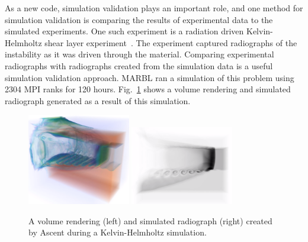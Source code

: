 As a new code, simulation validation plays an important role, and one method
for simulation validation is comparing the results of experimental data to the
simulated experiments.
%
One such experiment is a radiation driven Kelvin-Helmholtz shear
layer experiment~\cite{hurricane2009high}.
%
The experiment captured radiographs of the instability as it was driven through
the material. Comparing experimental radiographs with radiographs created from
the simulation data is a useful simulation validation approach.
%
MARBL ran a simulation of this problem using 2304 MPI ranks for 120 hours.
%
Fig.~\ref{img:radkh} shows a volume rendering and simulated radiograph
generated as a result of this simulation.
%
\begin{figure}
\centering
\includegraphics[width=0.4\textwidth]{images/radkh}
\includegraphics[width=0.4\textwidth]{images/radkh_xray}
  \caption{\label{img:radkh}A volume rendering (left) and simulated radiograph (right) created by
Ascent during a Kelvin-Helmholtz simulation.}
\end{figure}

%



